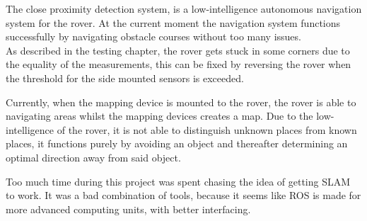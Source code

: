 The close proximity detection system, is a low-intelligence autonomous navigation system for the rover. At the current moment the navigation system functions successfully by navigating obstacle courses without too many issues.\\
As described in the testing chapter, the rover gets stuck in some corners due to the equality of the measurements, this can be fixed by reversing the rover when the threshold for the side mounted sensors is exceeded.


Currently, when the mapping device is mounted to the rover, the rover is able to navigating areas whilst the mapping devices creates a map. Due to the low-intelligence of the rover, it is not able to distinguish unknown places from known places, it functions purely by avoiding an object and thereafter determining an optimal direction away from said object.


Too much time during this project was spent chasing the idea of getting SLAM to work. It was a bad combination of tools, because it seems like ROS is made for more advanced computing units, with better interfacing. 
